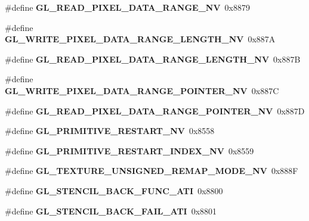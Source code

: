 \begin{DoxyCompactItemize}
\item 
\#define {\bfseries G\+L\+\_\+\+R\+E\+A\+D\+\_\+\+P\+I\+X\+E\+L\+\_\+\+D\+A\+T\+A\+\_\+\+R\+A\+N\+G\+E\+\_\+\+N\+V}~0x8879\label{_s_d_l__opengl_8h_a82071036af78e8d252a73705853a6bba}

\item 
\#define {\bfseries G\+L\+\_\+\+W\+R\+I\+T\+E\+\_\+\+P\+I\+X\+E\+L\+\_\+\+D\+A\+T\+A\+\_\+\+R\+A\+N\+G\+E\+\_\+\+L\+E\+N\+G\+T\+H\+\_\+\+N\+V}~0x887\+A\label{_s_d_l__opengl_8h_a5f35011157007ff9d591444edc4da526}

\item 
\#define {\bfseries G\+L\+\_\+\+R\+E\+A\+D\+\_\+\+P\+I\+X\+E\+L\+\_\+\+D\+A\+T\+A\+\_\+\+R\+A\+N\+G\+E\+\_\+\+L\+E\+N\+G\+T\+H\+\_\+\+N\+V}~0x887\+B\label{_s_d_l__opengl_8h_ae89f6f39673fdca7a0f66faf56cdfa20}

\item 
\#define {\bfseries G\+L\+\_\+\+W\+R\+I\+T\+E\+\_\+\+P\+I\+X\+E\+L\+\_\+\+D\+A\+T\+A\+\_\+\+R\+A\+N\+G\+E\+\_\+\+P\+O\+I\+N\+T\+E\+R\+\_\+\+N\+V}~0x887\+C\label{_s_d_l__opengl_8h_accace2ba150699c99a88479848da7411}

\item 
\#define {\bfseries G\+L\+\_\+\+R\+E\+A\+D\+\_\+\+P\+I\+X\+E\+L\+\_\+\+D\+A\+T\+A\+\_\+\+R\+A\+N\+G\+E\+\_\+\+P\+O\+I\+N\+T\+E\+R\+\_\+\+N\+V}~0x887\+D\label{_s_d_l__opengl_8h_abc16b6d79de9de947eb13c597d8054eb}

\item 
\#define {\bfseries G\+L\+\_\+\+P\+R\+I\+M\+I\+T\+I\+V\+E\+\_\+\+R\+E\+S\+T\+A\+R\+T\+\_\+\+N\+V}~0x8558\label{_s_d_l__opengl_8h_a999db7d2d9673547a8d88d5521396e0c}

\item 
\#define {\bfseries G\+L\+\_\+\+P\+R\+I\+M\+I\+T\+I\+V\+E\+\_\+\+R\+E\+S\+T\+A\+R\+T\+\_\+\+I\+N\+D\+E\+X\+\_\+\+N\+V}~0x8559\label{_s_d_l__opengl_8h_a6d2449fc10865402de703707dd764648}

\item 
\#define {\bfseries G\+L\+\_\+\+T\+E\+X\+T\+U\+R\+E\+\_\+\+U\+N\+S\+I\+G\+N\+E\+D\+\_\+\+R\+E\+M\+A\+P\+\_\+\+M\+O\+D\+E\+\_\+\+N\+V}~0x888\+F\label{_s_d_l__opengl_8h_a4c53aadd37e3245fe37f5b3ee9328961}

\item 
\#define {\bfseries G\+L\+\_\+\+S\+T\+E\+N\+C\+I\+L\+\_\+\+B\+A\+C\+K\+\_\+\+F\+U\+N\+C\+\_\+\+A\+T\+I}~0x8800\label{_s_d_l__opengl_8h_a9493f2a338e099361a0ec2668031b5d1}

\item 
\#define {\bfseries G\+L\+\_\+\+S\+T\+E\+N\+C\+I\+L\+\_\+\+B\+A\+C\+K\+\_\+\+F\+A\+I\+L\+\_\+\+A\+T\+I}~0x8801\label{_s_d_l__opengl_8h_ae23363d61c051ebcc7136e3cd3b49849}


\end{DoxyCompactItemize}
